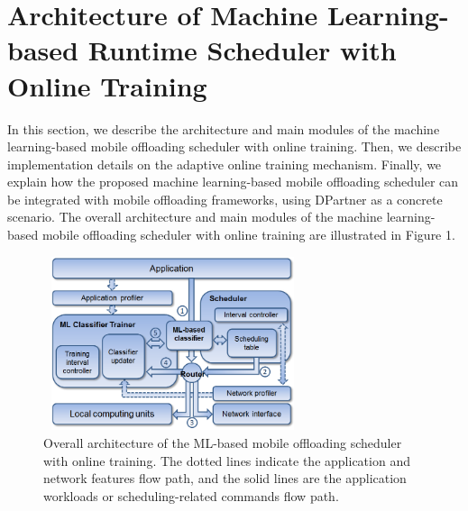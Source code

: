 \documentclass[10pt, conference, compsocconf]{IEEEtran}
\begin{document}
\section{Architecture of Machine Learning-based Runtime Scheduler with
Online Training}
%
In this section, we describe the architecture and main modules of the
machine learning-based mobile offloading scheduler with online training.
%
Then, we describe implementation details on the adaptive online training
mechanism.
%
Finally, we explain how the proposed machine learning-based mobile
offloading scheduler can be integrated with mobile offloading frameworks,
using DPartner as a concrete scenario.
%
The overall architecture and main modules of the machine learning-based
mobile offloading scheduler with online training are illustrated in
Figure 1.
%
\begin{figure}
\centering
\includegraphics[height=5.1cm, width=7.6cm]{Figure/figure1}
\caption{Overall architecture of the ML-based mobile offloading
scheduler with online training. The dotted lines indicate the
application and network features flow path, and the solid lines are the
application workloads or scheduling-related commands flow path.}
\end{figure}
%
\end{document}
